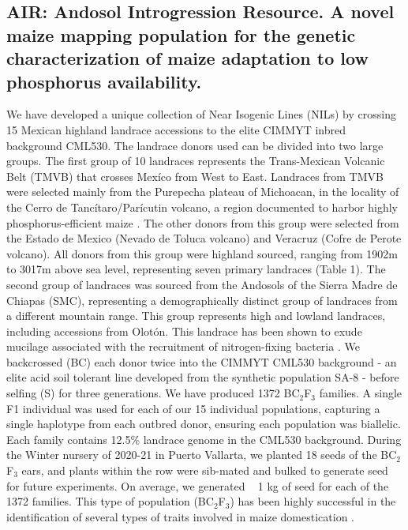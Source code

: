 \subsection{AIR: Andosol Introgression Resource. A novel maize mapping population for the genetic characterization of maize adaptation to low phosphorus availability.} 

We have developed a unique collection of Near Isogenic Lines (NILs) by crossing 15 Mexican highland landrace accessions to the elite CIMMYT inbred background CML530.
The landrace donors used can be divided into two large groups. The first group of 10 landraces represents the Trans-Mexican Volcanic Belt (TMVB) that crosses Mexíco from West to East.
Landraces from TMVB were selected mainly from the Purepecha plateau of Michoacan, in the locality of the Cerro de Tancítaro/Parícutin volcano, a region documented to harbor highly phosphorus-efficient maize \citep{bayuelo-jimenez2011}. The other donors from this group were selected from the Estado de Mexico (Nevado de Toluca volcano) and Veracruz (Cofre de Perote volcano).
All donors from this group were highland sourced, ranging from 1902m to 3017m above sea level, representing seven primary landraces (Table 1). The second group of landraces was sourced from the Andosols of the Sierra Madre de Chiapas (SMC), representing a demographically distinct group of landraces from a different mountain range. This group represents high and lowland landraces, including accessions from Olotón. This landrace has been shown to exude mucilage associated with the recruitment of nitrogen-fixing bacteria \citep{vandeynze2018}.
We backcrossed (BC) each donor twice into the CIMMYT CML530 background - an elite acid soil tolerant line developed from the synthetic population SA-8 \citep{granados1995} - before selfing (S) for three generations. We have produced 1372 BC$_2$F$_3$ families.
A single F1 individual was used for each of our 15 individual populations, capturing a single haplotype from each outbred donor, ensuring each population was biallelic. Each family contains 12.5\% landrace genome in the CML530 background. During the Winter nursery of 2020-21 in Puerto Vallarta, we planted 18 seeds of the BC$_2$F$_3$ ears, and plants within the row were sib-mated and bulked to generate seed for future experiments. On average, we generated ~ 1 kg of seed for each of the 1372 families.
This type of population (BC$_2$F$_3$) has been highly successful in the identification of several types of traits involved in maize domestication \citep{xu2017b,guo2018a,liang2019,tian2019}.


